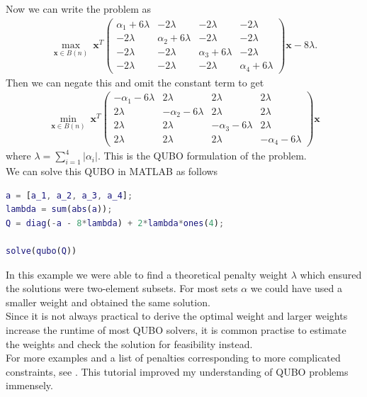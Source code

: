 \documentclass{article}
\begin{document}
\noindent Now we can write the problem as
\begin{align*}
	\max_{\mathbf{x} \in B(n)} \: \mathbf{x}^T \begin{pmatrix}
        \alpha_1 + 6\lambda & -2\lambda & -2\lambda & -2\lambda \\
        -2\lambda  & \alpha_2 + 6\lambda  & -2\lambda & -2\lambda\\
        -2\lambda & -2\lambda & \alpha_3 + 6\lambda & -2\lambda \\
        -2\lambda & -2\lambda & -2\lambda & \alpha_4 + 6\lambda
	\end{pmatrix} \mathbf{x} - 8\lambda.
\end{align*}
Then we can negate this and omit the constant term to get
\begin{align*}
    \min_{\mathbf{x} \in B(n)} \: \mathbf{x}^T \begin{pmatrix}
        -\alpha_1 - 6\lambda & 2\lambda & 2\lambda & 2\lambda \\
        2\lambda  & -\alpha_2 - 6\lambda & 2\lambda & 2\lambda\\
        2\lambda & 2\lambda & -\alpha_3 - 6\lambda & 2\lambda \\
        2\lambda & 2\lambda & 2\lambda & -\alpha_4 - 6\lambda
	\end{pmatrix} \mathbf{x}
\end{align*}
where \(\lambda = \sum_{i=1}^4 |\alpha_i|\). This is the QUBO formulation of the problem.\\

\noindent We can solve this QUBO in MATLAB as follows
\begin{lstlisting}[language=MATLAB]
a = [a_1, a_2, a_3, a_4];
lambda = sum(abs(a));
Q = diag(-a - 8*lambda) + 2*lambda*ones(4);

solve(qubo(Q))
\end{lstlisting} 

\noindent In this example we were able to find a theoretical penalty weight \(\lambda\) which ensured the solutions were two-element subsets. For most sets \(\alpha\) we could have used a smaller weight and obtained the same solution.\\
Since it is not always practical to derive the optimal weight and larger weights increase the runtime of most QUBO solvers, it is common practise to estimate the weights and check the solution for feasibility instead. \\

\noindent For more examples and a list of penalties corresponding to more complicated constraints, see \cite[p.~10]{tutorialQUBO}. This tutorial improved my understanding of QUBO problems immensely.\\
\end{document}
